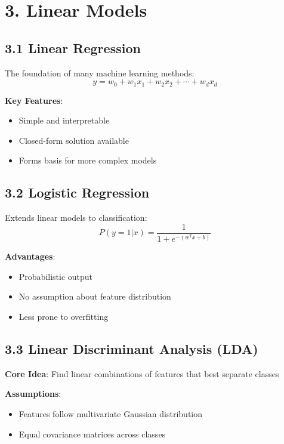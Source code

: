 \documentclass{amsart}
\theoremstyle{plain}
\theoremstyle{definition}
\theoremstyle{remark}
\begin{document}
\section{3. Linear Models}

\subsection{3.1 Linear Regression}

The foundation of many machine learning methods:
\[
y = w_0 + w_1x_1 + w_2x_2 + \cdots + w_dx_d
\]

\textbf{Key Features}:

\begin{itemize}
	\item Simple and interpretable
	\item Closed-form solution available
	\item Forms basis for more complex models
\end{itemize}

\subsection{3.2 Logistic Regression}

Extends linear models to classification:
\[
P(y=1|x) = \frac{1}{1 + e^{-(w^Tx + b)}}
\]

\textbf{Advantages}:

\begin{itemize}
	\item Probabilistic output
	\item No assumption about feature distribution
	\item Less prone to overfitting
\end{itemize}

\subsection{3.3 Linear Discriminant Analysis (LDA)}

\textbf{Core Idea}: Find linear combinations of features that best separate classes

\textbf{Assumptions}:

\begin{itemize}
	\item Features follow multivariate Gaussian distribution
	\item Equal covariance matrices across classes
\end{itemize}
\end{document}
